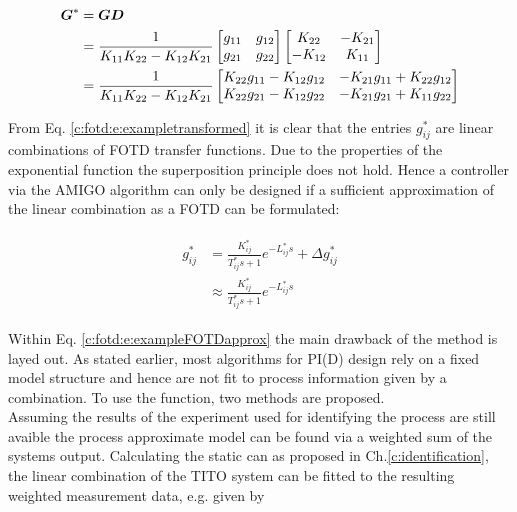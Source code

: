 \begin{align}
\begin{split}
\mbox{\boldmath$G$}^* &= \mbox{\boldmath$G$}\mbox{\boldmath$D$}\\
&= \frac{1}{K_{11}K_{22}-K_{12}K_{21}} 
\begin{bmatrix}
g_{11} & g_{12} \\
g_{21} & g_{22}
\end{bmatrix}
\begin{bmatrix}
K_{22} & -K_{21} \\
-K_{12} & K_{11}
\end{bmatrix} \\
&= \frac{1}{K_{11}K_{22}-K_{12}K_{21}}
\begin{bmatrix}
K_{22}g_{11}-K_{12}g_{12} & -K_{21}g_{11}+K_{22}g_{12} \\
K_{22}g_{21}-K_{12}g_{22} &
-K_{21}g_{21}+K_{11}g_{22}
\end{bmatrix}
\end{split}
\label{c:fotd:e:exampletransformed}
\end{align}

From Eq. \ref{c:fotd:e:exampletransformed} it is clear that the entries $g_{ij}^*$ are linear combinations of FOTD transfer functions. Due to the properties of the exponential function the superposition principle does not hold. Hence a controller via the AMIGO algorithm can only be designed if a sufficient approximation of the linear combination as a FOTD can be formulated:

\begin{align}
\begin{split}
g_{ij}^* & = \frac{K_{ij}^*}{T_{ij}^*s+1}e^{-L_{ij}^* s} + \Delta g_{ij}^*\\
&\approx \frac{K_{ij}^*}{T_{ij}^*s+1}e^{-L_{ij}^* s} 
\end{split}
\label{c:fotd:e:exampleFOTDapprox}
\end{align}

Within Eq. \ref{c:fotd:e:exampleFOTDapprox} the main drawback of the method is layed out. As stated earlier, most algorithms for PI(D) design rely on a fixed model structure and hence are not fit to process information given by a combination. To use the function, two methods are proposed.\\

Assuming the results of the experiment used for identifying the process are still avaible the process approximate model can be found via a weighted sum of the systems output. Calculating the static can as proposed in Ch.\ref{c:identification}, the linear combination of the TITO system can be fitted to the resulting weighted measurement data, e.g. given by

